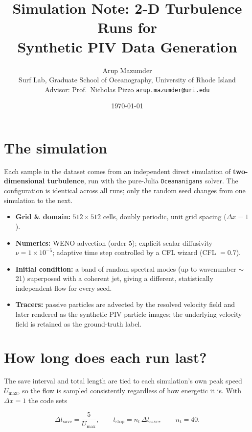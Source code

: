 \documentclass[11pt]{article}
\title{\textbf{Simulation Note: 2-D Turbulence Runs for\\ Synthetic PIV Data Generation}}
\author{Arup Mazumder \\ \small Surf Lab, Graduate School of Oceanography, University of Rhode Island \\ \small Advisor: Prof.\ Nicholas Pizzo \quad\textbar\quad \texttt{arup.mazumder@uri.edu}}
\date{\today}
\newcommand{\code}[1]{\texttt{\small #1}}
\begin{document}
\maketitle

\section{The simulation}
Each sample in the dataset comes from an independent direct simulation of
\textbf{two-dimensional turbulence}, run with the pure-Julia \code{Oceananigans}
solver. The configuration is identical across all runs; only the random seed
changes from one simulation to the next.

\begin{itemize}
  \item \textbf{Grid \& domain:} $512\times512$ cells, doubly periodic, unit grid
        spacing ($\Delta x = 1$).
  \item \textbf{Numerics:} WENO advection (order 5); explicit scalar diffusivity
        $\nu = 1\times10^{-5}$; adaptive time step controlled by a CFL wizard
        (CFL $=0.7$).
  \item \textbf{Initial condition:} a band of random spectral modes (up to
        wavenumber $\sim$21) superposed with a coherent jet, giving a different,
        statistically independent flow for every seed.
  \item \textbf{Tracers:} passive particles are advected by the resolved velocity
        field and later rendered as the synthetic PIV particle images; the
        underlying velocity field is retained as the ground-truth label.
\end{itemize}

\section{How long does each run last?}
The save interval and total length are tied to each simulation's own peak speed
$U_{\max}$, so the flow is sampled consistently regardless of how energetic it is.
With $\Delta x = 1$ the code sets

\begin{equation}
  \Delta t_{\text{save}} = \frac{5}{U_{\max}},
  \qquad
  t_{\text{stop}} = n_t\,\Delta t_{\text{save}},
  \qquad n_t = 40 .
\end{equation}
\end{document}
